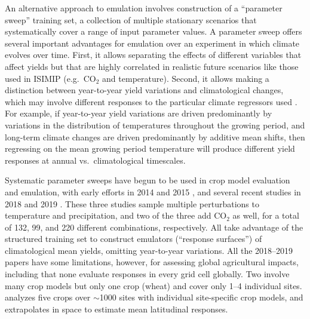 \documentclass[gmdd]{copernicus} %
\begin{document}
An alternative approach to emulation involves construction of a ``parameter sweep'' training set, a collection of multiple stationary scenarios that systematically cover a range of input parameter values.
A parameter sweep offers several important advantages for emulation over an experiment in which climate evolves over time. 
First, it allows separating the effects of different variables that affect yields but that are highly correlated in realistic future scenarios like those used in ISIMIP (e.g.\ CO$_2$ and temperature). 
Second, it allows making a distinction between year-to-year yield variations and climatological changes, which may involve different responses to the particular climate regressors used \citep[e.g.][]{Ruane2016}. 
For example, if year-to-year yield variations are driven predominantly by variations in the distribution of temperatures throughout the growing period, and long-term climate changes are driven predominantly by additive mean shifts, then regressing on the mean growing period temperature will produce different yield responses at annual vs.\ climatological timescales.  

Systematic parameter sweeps have begun to be used in crop model evaluation and emulation, with early efforts in 2014 and 2015 \citep{ruane2014, Markowski2015, Pirttioja2015}, and several recent studies in 2018 and 2019 \citep{FRONZEK20182, RUIZRAMOS2018,Snyder2018}. 
These three studies sample multiple perturbations to temperature and precipitation, and two of the three add CO$_2$ as well, for a total of 132, 99, and 220 different combinations, respectively. 
All take advantage of the structured training set to construct emulators (``response surfaces'') of climatological mean yields, omitting year-to-year variations. 
All the 2018--2019 papers have some limitations, however, for assessing global agricultural impacts, including that
none evaluate responses in every grid cell globally.
Two involve many crop models but only one crop (wheat) \citep{FRONZEK20182, RUIZRAMOS2018} and cover only 1--4 individual sites. 
\citet{Snyder2018} analyzes five crops over $\sim$1000 sites with individual site-specific crop models, and extrapolates in space to estimate mean latitudinal responses.
\end{document}
